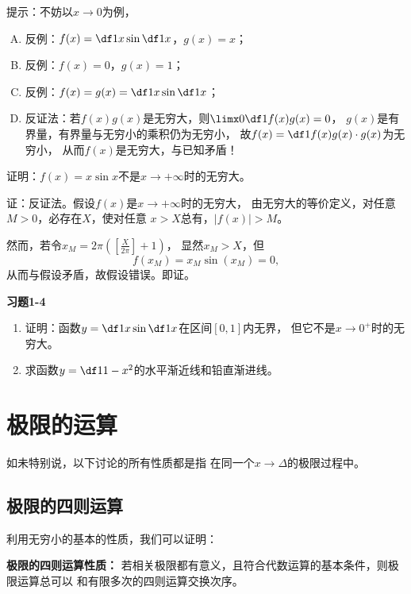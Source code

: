 \ifhint
提示：不妨以$x\to0$为例，
\begin{enumerate}[(A)]
    \setlength{\itemindent}{1cm}
	\item 反例：$f(x)=\df1x\sin\df1x$，$g(x)=x$；
	\item 反例：$f(x)=0$，$g(x)=1$；
	\item 反例：$f(x)=g(x)=\df1x\sin\df1x$；
	\item 反证法：若$f(x)g(x)$是无穷大，则$\limx0\df1{f(x)g(x)}=0$，
	$g(x)$是有界量，有界量与无穷小的乘积仍为无穷小，
	故$f(x)=\df1{f(x)g(x)}\cdot g(x)$为无穷小，
	从而$f(x)$是无穷大，与已知矛盾！\fin
\end{enumerate}
\fi

\bs
\egz 证明：$f(x)=x\sin x$不是$x\to+\infty$时的无穷大。

证：反证法。假设$f(x)$是$x\to+\infty$时的无穷大，
由无穷大的等价定义，对任意$M>0$，必存在$X$，使对任意
$x>X$总有，$|f(x)|>M$。

然而，若令$x_M=2\pi\left(\left[\frac{X}{2\pi}\right]+1\right)$，
显然$x_M>X$，但
$$f(x_M)=x_M\sin(x_M)=0,$$
从而与假设矛盾，故假设错误。即证。\fin

\bs
\begin{ext}
	{\centering\bf 习题1-4}
	
	\begin{enumerate}  
	  \item 证明：函数$y=\df1x\sin\df1x$在区间$[0,1]$内无界，
	  但它不是$x\to 0^+$时的无穷大。
	  \item 求函数$y=\df1{1-x^2}$的水平渐近线和铅直渐进线。
	\end{enumerate}
\end{ext}

\newpage
\section{极限的运算}

如未特别说，以下讨论的所有性质都是指
在同一个$x\to\Delta$的极限过程中。

\subsection{极限的四则运算}

利用无穷小的基本的性质，我们可以证明：

\begin{thx}
	{\bf 极限的四则运算性质：}
	若相关极限都有意义，且符合代数运算的基本条件，则极限运算总可以
	和有限多次的四则运算交换次序。
\end{thx}

